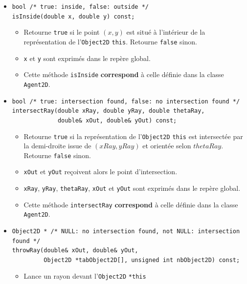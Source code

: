 \documentclass[12pt]{article}
\begin{document}
\begin{itemize}
\item \verb|bool /* true: inside, false: outside */| \\
      \verb!isInside(double x, double y) const;!
      \begin{itemize}
      \item Retourne {\tt true} si le point $(x,y)$ est situ\'e \`a
            l'int\'erieur de la repr\'esentation de l'{\tt Object2D}
            {\tt *this}.
            Retourne {\tt false} sinon.
      \item \verb!x! et \verb!y! sont exprim\'es dans le rep\`ere global.
      \item Cette m\'ethode {\tt isInside} {\bf correspond}
            \`a celle d\'efinie dans la classe {\tt Agent2D}.
      \end{itemize}
\item \verb|bool /* true: intersection found, false: no intersection found */|\\      \verb!intersectRay(double xRay, double yRay, double thetaRay,!\\
      \verb!             double& xOut, double& yOut) const;!
      \begin{itemize}
      \item  Retourne {\tt true} si la repr\'esentation de l'{\tt Object2D}
             {\tt *this} est intersect\'ee par la demi-droite issue de
             $(xRay,yRay)$ et orient\'ee selon $thetaRay$.
             Retourne {\tt false} sinon.
      \item \verb!xOut! et \verb!yOut! re\c coivent alors le point
            d'intersection.
      \item \verb!xRay!, \verb!yRay!, \verb!thetaRay!, \verb!xOut! et
            \verb!yOut! sont exprim\'es dans le rep\`ere global.
      \item Cette m\'ethode {\tt intersectRay} {\bf correspond}
            \`a celle d\'efinie dans la classe {\tt Agent2D}.
      \end{itemize}
\item \verb!Object2D * /* NULL: no intersection found, not NULL: intersection found */! \\
      \verb!throwRay(double& xOut, double& yOut,! \\
      \verb!         Object2D *tabObject2D[], unsigned int nbObject2D) const;!
      \begin{itemize}
      \item Lance un rayon devant l'{\tt Object2D} \verb!*this!

\end{itemize}
\end{itemize}
\end{document}
